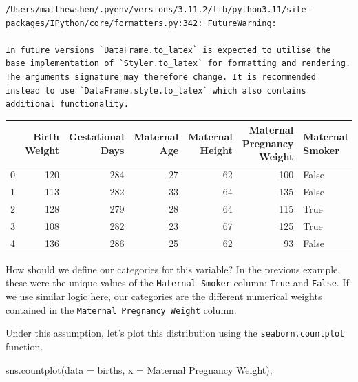 \documentclass[
  letterpaper,
  DIV=11,
  numbers=noendperiod]{scrreprt}
\newenvironment{Shaded}{\begin{snugshade}}{\end{snugshade}}
\newcommand{\NormalTok}[1]{\textcolor[rgb]{0.00,0.23,0.31}{#1}}
\newcommand{\OperatorTok}[1]{\textcolor[rgb]{0.37,0.37,0.37}{#1}}
\newcommand{\StringTok}[1]{\textcolor[rgb]{0.13,0.47,0.30}{#1}}
\begin{document}
\begin{verbatim}
/Users/matthewshen/.pyenv/versions/3.11.2/lib/python3.11/site-packages/IPython/core/formatters.py:342: FutureWarning:

In future versions `DataFrame.to_latex` is expected to utilise the base implementation of `Styler.to_latex` for formatting and rendering. The arguments signature may therefore change. It is recommended instead to use `DataFrame.style.to_latex` which also contains additional functionality.
\end{verbatim}

\begin{tabular}{lrrrrrl}
\toprule
{} &  Birth Weight &  Gestational Days &  Maternal Age &  Maternal Height &  Maternal Pregnancy Weight &  Maternal Smoker \\
\midrule
0 &           120 &               284 &            27 &               62 &                        100 &            False \\
1 &           113 &               282 &            33 &               64 &                        135 &            False \\
2 &           128 &               279 &            28 &               64 &                        115 &             True \\
3 &           108 &               282 &            23 &               67 &                        125 &             True \\
4 &           136 &               286 &            25 &               62 &                         93 &            False \\
\bottomrule
\end{tabular}

How should we define our categories for this variable? In the previous
example, these were the unique values of the \texttt{Maternal\ Smoker}
column: \texttt{True} and \texttt{False}. If we use similar logic here,
our categories are the different numerical weights contained in the
\texttt{Maternal\ Pregnancy\ Weight} column.

Under this assumption, let's plot this distribution using the
\texttt{seaborn.countplot} function.

\begin{Shaded}
\begin{Highlighting}[]
\NormalTok{sns.countplot(data }\OperatorTok{=}\NormalTok{ births, x }\OperatorTok{=} \StringTok{\textquotesingle{}Maternal Pregnancy Weight\textquotesingle{}}\NormalTok{)}\OperatorTok{;}
\end{Highlighting}
\end{Shaded}
\end{document}
